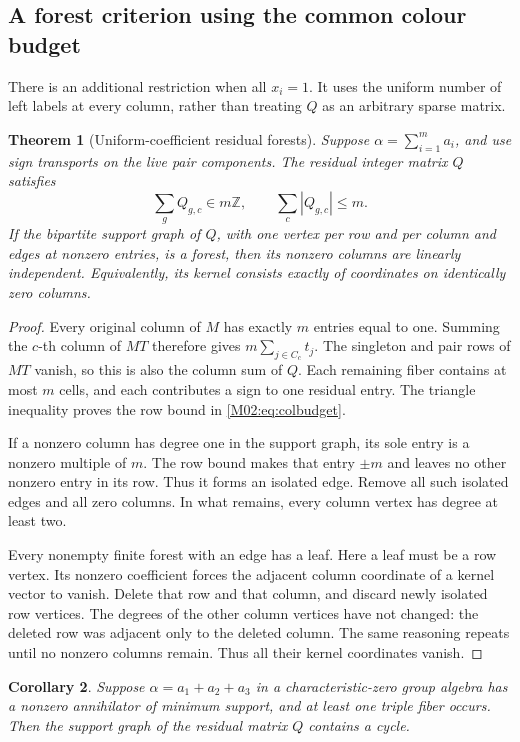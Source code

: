 \documentclass[11pt,a4paper,oneside]{report}
\newtheorem{theorem}{Theorem}[section]
\newtheorem{corollary}[theorem]{Corollary}
\theoremstyle{definition}
\theoremstyle{remark}
\newcommand{\Z}{\mathbb Z}
\begin{document}
\subsection{A forest criterion using the common colour budget}\label{M02:sec:residualforest}
There is an additional restriction when all \(x_i=1\). It uses the uniform number of left labels at every column, rather than treating \(Q\) as an arbitrary sparse matrix.
\begin{theorem}[Uniform-coefficient residual forests]\label{M02:thm:residualforest}
Suppose \(\alpha=\sum_{i=1}^m a_i\), and use sign transports on the live pair components. The residual integer matrix \(Q\) satisfies
\begin{equation}\label{M02:eq:colbudget}
\sum_gQ_{g,c}\in m\Z,\qquad
\sum_c|Q_{g,c}|\le m.
\end{equation}
If the bipartite support graph of \(Q\), with one vertex per row and per column and edges at nonzero entries, is a forest, then its nonzero columns are linearly independent. Equivalently, its kernel consists exactly of coordinates on identically zero columns.
\end{theorem}
\begin{proof}
Every original column of \(M\) has exactly \(m\) entries equal to one. Summing the \(c\)-th column of \(MT\) therefore gives \(m\sum_{j\in C_c}t_j\). The singleton and pair rows of \(MT\) vanish, so this is also the column sum of \(Q\). Each remaining fiber contains at most \(m\) cells, and each contributes a sign to one residual entry. The triangle inequality proves the row bound in \eqref{M02:eq:colbudget}.

If a nonzero column has degree one in the support graph, its sole entry is a nonzero multiple of \(m\). The row bound makes that entry \(\pm m\) and leaves no other nonzero entry in its row. Thus it forms an isolated edge. Remove all such isolated edges and all zero columns. In what remains, every column vertex has degree at least two.

Every nonempty finite forest with an edge has a leaf. Here a leaf must be a row vertex. Its nonzero coefficient forces the adjacent column coordinate of a kernel vector to vanish. Delete that row and that column, and discard newly isolated row vertices. The degrees of the other column vertices have not changed: the deleted row was adjacent only to the deleted column. The same reasoning repeats until no nonzero columns remain. Thus all their kernel coordinates vanish.
\end{proof}
\begin{corollary}\label{M02:cor:residualcycle}
Suppose \(\alpha=a_1+a_2+a_3\) in a characteristic-zero group algebra has a nonzero annihilator of minimum support, and at least one triple fiber occurs. Then the support graph of the residual matrix \(Q\) contains a cycle.
\end{corollary}
\end{document}

